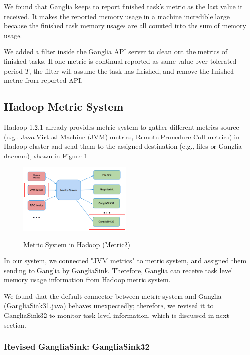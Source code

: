 We found that Ganglia keeps to report finished task's metric as the last value it received. It makes the reported memory usage in a machine incredible large because the finished task memory usages are all counted into the sum of memory usage.

We added a filter inside the Ganglia API server to clean out the metrics of finished tasks. If one metric is continual reported as same value over tolerated period $T$, the filter will assume the task has finished, and remove the finished metric from reported API.

\subsection{Hadoop Metric System}

Hadoop 1.2.1 already provides metric system to gather different metrics source (e.g., Java Virtual Machine (JVM) metrics, Remote Procedure Call metrics) in Hadoop cluster and send them to the assigned destination (e.g., files or Ganglia daemon), shown in Figure \ref{figure-metric2}.

\begin{figure}[h!]
  \centering
    \includegraphics[width=0.5\textwidth]{image/ganglia32}
    \label{figure-metric2}
  \caption{Metric System in Hadoop (Metric2)}
\end{figure}

In our system, we connected "JVM metrics" to metric system, and assigned them sending to Ganglia by GangliaSink. Therefore, Ganglia can receive task level memory usage information from Hadoop metric system.

We found that the default connector between metric system and Ganglia (GangliaSink31.java) behaves unexpectedly; therefore, we revised it to GangliaSink32 to monitor task level information, which is discussed in next section.

\subsubsection{Revised GangliaSink: GangliaSink32}

